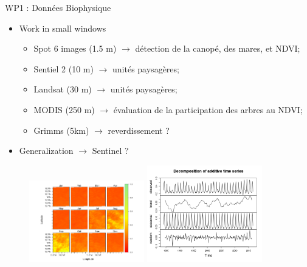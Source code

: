 \documentclass[newPxFont]{beamer}
\begin{document}

\begin{frame}[c]{WP1 : Données Biophysique}
\vspace{-2em}
\begin{itemize}
  \item Work in small windows
  \begin{itemize}
    \item Spot 6 images (1.5 m) $\rightarrow$ détection de la canopé, des mares, et NDVI;
    \item Sentiel 2 (10 m) $\rightarrow$ unités paysagères;
    \item Landsat (30 m) $\rightarrow$ unités paysagères;
    \item MODIS (250 m) $\rightarrow$ évaluation de la participation des arbres au NDVI;
    \item Grimms (5km) $\rightarrow$ reverdissement ?
  \end{itemize}
  \item Generalization $\rightarrow$ Sentinel ?
\end{itemize}
\vspace{-1em}
\begin{figure}
	\centering
	\includegraphics[width = 5cm]{img/NDVI2015}
  \includegraphics[width = 5cm]{img/reverdiement}
\end{figure}
\end{frame}
\end{document}
